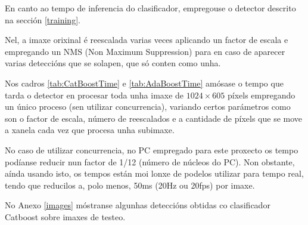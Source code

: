 \documentclass[galician]{./head/uvigo-tfg}
\begin{document}
    \par En canto ao tempo de inferencia do clasificador, empregouse o detector descrito na sección \ref{training}.
    \par Nel, a imaxe orixinal é reescalada varias veces aplicando un factor de escala e empregando un NMS (Non Maximum Suppression) para en caso de aparecer varias deteccións que se solapen, que só conten como unha.
    \par Nos cadros \ref{tab:CatBoostTime} e \ref{tab:AdaBoostTime} amósase o tempo que tarda o detector en procesar toda unha imaxe de $1024\times605$ píxels empregando un único proceso (sen utilizar concurrencia), variando certos parámetros como son o factor de escala, número de reescalados e a cantidade de píxels que se move a xanela cada vez que procesa unha subimaxe.
    \par No caso de utilizar concurrencia, no PC empregado para este proxecto os tempo podíanse reducir nun factor de 1/12 (número de núcleos do PC). Non obstante, aínda usando isto, os tempos están moi lonxe de podelos utilizar para tempo real, tendo que reducilos a, polo menos, 50ms (20Hz ou 20fps) por imaxe.
    \par No Anexo \ref{images} móstranse algunhas deteccións obtidas co clasificador Catboost sobre imaxes de testeo.
    
    
\end{document}
